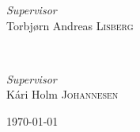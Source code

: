 \begin{titlepage}
	\bigskip
	
	\begin{minipage}{0.32\textwidth}
		\begin{flushleft}
			\large
			\textit{Supervisor}\\
			Torbjørn Andreas \textsc{Lisberg} %
		\end{flushleft}
	\end{minipage}
	~
	\begin{minipage}{0.32\textwidth}
		\begin{flushright}
			\large
			\textit{Supervisor}\\
			Kári Holm   \textsc{Johannesen} %
		\end{flushright}
	\end{minipage}
	
	
	
	
	
	
	\vfill\vfill\vfill %
	
	{\large\today} %
	
	
	 
	
	\vfill %
	
\end{titlepage}